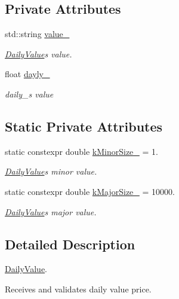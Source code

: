 \subsection*{Private Attributes}
\begin{DoxyCompactItemize}
\item 
std\+::string \hyperlink{classDailyValue_a5021486135be58a69bd0c57c81ccb9c6}{value\+\_\+}
\begin{DoxyCompactList}\small\item\em \hyperlink{classDailyValue}{Daily\+Value}\textquotesingle{}s value. \end{DoxyCompactList}\item 
float \hyperlink{classDailyValue_a6316632ee7e3c421b917a423c22b9182}{dayly\+\_\+}
\begin{DoxyCompactList}\small\item\em daily\+\_\+\textquotesingle{}s value \end{DoxyCompactList}\end{DoxyCompactItemize}
\subsection*{Static Private Attributes}
\begin{DoxyCompactItemize}
\item 
static constexpr double \hyperlink{classDailyValue_a3d11c9df8edcc21b45b1807b63cf48e0}{k\+Minor\+Size\+\_\+} = 1.
\begin{DoxyCompactList}\small\item\em \hyperlink{classDailyValue}{Daily\+Value}\textquotesingle{}s minor value. \end{DoxyCompactList}\item 
static constexpr double \hyperlink{classDailyValue_ac96d2da50ecbba486d4145ddc477cba5}{k\+Major\+Size\+\_\+} = 10000.
\begin{DoxyCompactList}\small\item\em \hyperlink{classDailyValue}{Daily\+Value}\textquotesingle{}s major value. \end{DoxyCompactList}\end{DoxyCompactItemize}


\subsection{Detailed Description}
\hyperlink{classDailyValue}{Daily\+Value}. 

Receives and validates daily value price. 

